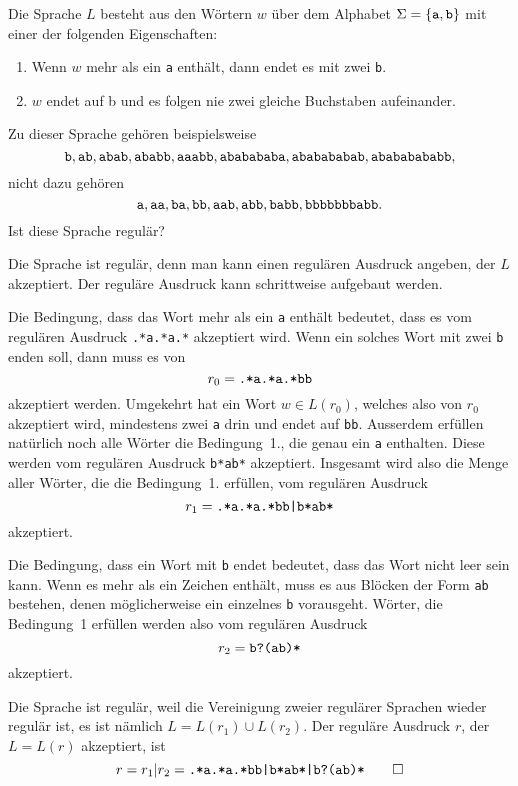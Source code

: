 Die Sprache $L$ besteht aus den Wörtern $w$ über dem Alphabet
$\Sigma=\{\text{\tt a},\text{\tt b}\}$ mit einer der folgenden Eigenschaften:
\begin{enumerate}
\item Wenn $w$ mehr als ein {\tt a} enthält, dann endet es mit zwei {\tt b}.
\item $w$ endet auf {\text b} und es folgen nie zwei gleiche
Buchstaben aufeinander.
\end{enumerate}
Zu dieser Sprache gehören beispielsweise
\[
\text{\tt b},
\text{\tt ab},
\text{\tt abab},
\text{\tt ababb},
\text{\tt aaabb},
\text{\tt ababababa},
\text{\tt ababababab},
\text{\tt abababababb},
\]
nicht dazu gehören
\[
\text{\tt a},
\text{\tt aa},
\text{\tt ba},
\text{\tt bb},
\text{\tt aab},
\text{\tt abb},
\text{\tt babb},
\text{\tt bbbbbbbabb}.
\]
Ist diese Sprache regulär?


\begin{loesung}
Die Sprache ist regulär, denn man kann einen regulären Ausdruck
angeben, der $L$ akzeptiert. Der reguläre Ausdruck kann schrittweise
aufgebaut werden.

Die Bedingung, dass das Wort mehr als ein {\tt a} enthält bedeutet,
dass es vom regulären Ausdruck {\tt .*a.*a.*} akzeptiert wird. Wenn
ein solches Wort mit zwei {\tt b} enden soll, dann muss es von
\[
r_0=\text{\tt .*a.*a.*bb}
\]
akzeptiert werden.
Umgekehrt hat ein Wort $w\in L(r_0)$, welches also von $r_0$ akzeptiert
wird, mindestens zwei {\tt a} drin und endet auf {\tt bb}.
Ausserdem erfüllen natürlich noch alle Wörter
die Bedingung~1., die genau ein {\tt a} enthalten. Diese werden
vom regulären Ausdruck {\tt b*ab*} akzeptiert. Insgesamt wird also die
Menge aller Wörter, die die Bedingung~1. erfüllen, vom regulären
Ausdruck
\[
r_1=\text{\tt .*a.*a.*bb|b*ab*}
\]
akzeptiert.

Die Bedingung, dass ein Wort mit {\tt b} endet bedeutet, dass das Wort
nicht leer sein kann. Wenn es mehr als ein Zeichen enthält, muss es
aus Blöcken der Form {\tt ab} bestehen, denen möglicherweise ein
einzelnes {\tt b} vorausgeht. Wörter, die Bedingung~1 erfüllen werden
also vom regulären Ausdruck
\[
r_2=\text{\tt b?(ab)*}
\]
akzeptiert.

Die Sprache ist regulär, weil die Vereinigung zweier regulärer Sprachen
wieder regulär ist, es ist nämlich $L=L(r_1)\cup L(r_2)$. Der reguläre
Ausdruck $r$, der $L=L(r)$ akzeptiert, ist
\[
r=r_1|r_2 =
\text{\tt .*a.*a.*bb|b*ab*|b?(ab)*}
\qedhere
\]
\end{loesung}
